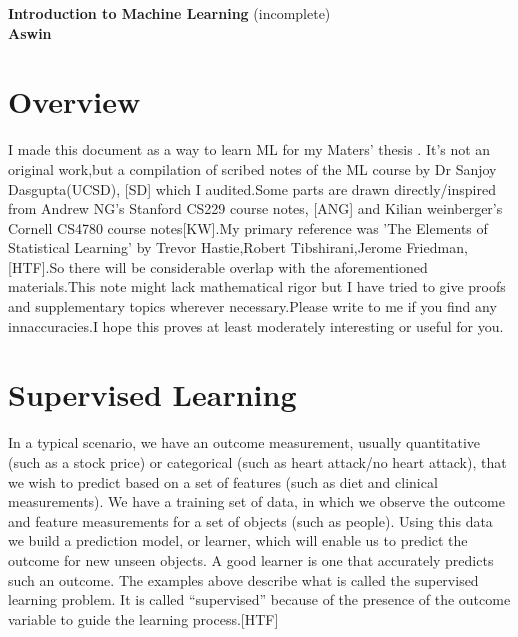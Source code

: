 \documentclass[12pt]{article}
\begin{document}
	
		\enlargethispage{2cm}
		
		\begin{center}
			
			\vspace*{-1cm}
			
			\textbf{\Large Introduction to Machine Learning     }(incomplete)\\[10pt]
			

\textbf{\Large Aswin}\\ [8pt]			
			
			\end{center}
		
\cleardoublepage

\section*{Overview}

I made this document as a way to learn ML for my Maters' thesis . It’s not an original work,but a compilation of scribed notes of the ML course by Dr Sanjoy Dasgupta(UCSD), [SD] which I audited.Some parts are drawn directly/inspired from Andrew NG's Stanford CS229 course notes, [ANG] and Kilian weinberger's Cornell CS4780 course notes[KW].My primary reference was 'The Elements of Statistical Learning' by Trevor Hastie,Robert Tibshirani,Jerome Friedman, [HTF].So there will be considerable overlap with the aforementioned materials.This note might lack mathematical rigor but I have tried to give proofs and supplementary topics wherever necessary.Please write to me if you find any innaccuracies.I hope this   proves at least moderately
interesting or useful for you.

\cleardoublepage

\section*{Supervised Learning}

	In a typical scenario, we have an outcome measurement, usually quantitative (such as a stock price) or
categorical (such as heart attack/no heart attack), that we wish to predict
based on a set of features (such as diet and clinical measurements). We
have a training set of data, in which we observe the outcome and feature
measurements for a set of objects (such as people). Using this data we build
a prediction model, or learner, which will enable us to predict the outcome
for new unseen objects. A good learner is one that accurately predicts such
an outcome.
The examples above describe what is called the supervised learning problem. It is called “supervised” because of the presence of the outcome variable to guide the learning process.[HTF]
\end{document}
